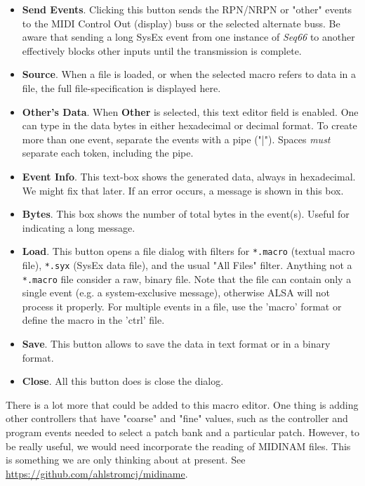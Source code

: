 \begin{itemize}
         of insert is incremented by one tick before inserting
         the next event.
      \item \textbf{Send Events}.
         Clicking this button sends the RPN/NRPN or "other" events to the
         MIDI Control Out (display) buss or the selected alternate buss.
         Be aware that sending a long SysEx event from one instance
         of \textsl{Seq66} to another effectively blocks other inputs
         until the transmission is complete.
      \item \textbf{Source}.
         When a file is loaded, or when the selected macro refers to
         data in a file, the full file-specification is displayed here.
      \item \textbf{Other's Data}.
         When \textbf{Other} is selected, this text editor field is enabled.
         One can type in the data bytes in either hexadecimal or decimal
         format. To create more than one event, separate the events
         with a pipe ("|"). Spaces \textsl{must} separate each token,
         including the pipe.
      \item \textbf{Event Info}.
         This text-box shows the generated data, always in hexadecimal.
         We might fix that later.
         If an error occurs, a message is shown in this box.
      \item \textbf{Bytes}.
         This box shows the number of total bytes in the event(s).
         Useful for indicating a long message.
      \item \textbf{Load}.
         This button opens a file dialog with filters for
         \texttt{*.macro} (textual macro file), \texttt{*.syx}
         (SysEx data file), and the usual "All Files" filter.
         Anything not a \texttt{*.macro} file consider a raw,
         binary file.
         Note that the file can contain only a single event (e.g.
         a system-exclusive message), otherwise ALSA will not process
         it properly.
         For multiple events in a file, use the 'macro' format
         or define the macro in the 'ctrl' file.
      \item \textbf{Save}.
         This button allows to save the data in text format or in
         a binary format.
      \item \textbf{Close}.
         All this button does is close the dialog.
   \end{itemize}

   There is a lot more that could be added to this macro editor.
   One thing is adding other controllers that have "coarse" and "fine"
   values, such as the controller and program events needed to
   select a patch bank and a particular patch.
   However, to be really useful, we would need incorporate the
   reading of MIDINAM files.
   This is something we are only thinking about at present.
   See \url{https://github.com/ahlstromcj/midiname}.

